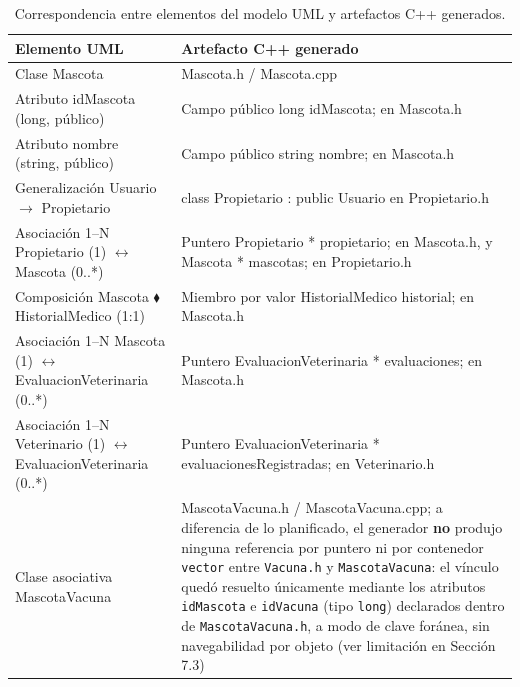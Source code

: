 \documentclass[journal,onecolumn]{IEEEtran}
\begin{document}
	\begin{table}[H]
		\centering
		\caption{Correspondencia entre elementos del modelo UML y artefactos C++ generados.}
		\label{tab:correspondencia}
		\begin{tabularx}{\linewidth}{|l|X|}
			\hline
			\textbf{Elemento UML} & \textbf{Artefacto C++ generado} \\
			\hline
			Clase Mascota & Mascota.h / Mascota.cpp \\ \hline
			Atributo idMascota (long, público) & Campo público long idMascota; en Mascota.h \\ \hline
			Atributo nombre (string, público) & Campo público string nombre; en Mascota.h \\ \hline
			Generalización Usuario $\to$ Propietario & class Propietario : public Usuario en Propietario.h \\ \hline
			Asociación 1--N Propietario (1) $\leftrightarrow$ Mascota (0..*) & Puntero Propietario * propietario; en Mascota.h, y Mascota * mascotas; en Propietario.h \\ \hline
			Composición Mascota $\blacklozenge$ HistorialMedico (1:1) & Miembro por valor HistorialMedico historial; en Mascota.h \\ \hline
			Asociación 1--N Mascota (1) $\leftrightarrow$ EvaluacionVeterinaria (0..*) & Puntero EvaluacionVeterinaria * evaluaciones; en Mascota.h \\ \hline
			Asociación 1--N Veterinario (1) $\leftrightarrow$ EvaluacionVeterinaria (0..*) & Puntero EvaluacionVeterinaria * evaluacionesRegistradas; en Veterinario.h \\ \hline
			Clase asociativa MascotaVacuna & MascotaVacuna.h / MascotaVacuna.cpp; a diferencia de lo planificado, el generador \textbf{no} produjo ninguna referencia por puntero ni por contenedor \texttt{vector} entre \texttt{Vacuna.h} y \texttt{MascotaVacuna}: el vínculo quedó resuelto únicamente mediante los atributos \texttt{idMascota} e \texttt{idVacuna} (tipo \texttt{long}) declarados dentro de \texttt{MascotaVacuna.h}, a modo de clave foránea, sin navegabilidad por objeto (ver limitación en Sección 7.3) \\ \hline
		\end{tabularx}
	\end{table}
	
\end{document}
